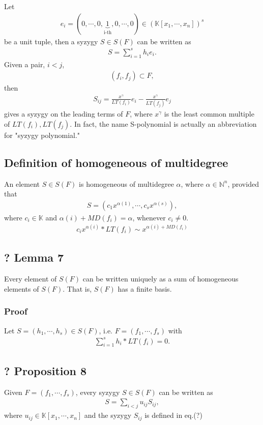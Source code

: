 \documentclass[11pt]{book}
\begin{document}
Let
\begin{eqnarray}
e_i = (0, \cdots, 0,\underbrace{1}_{\text{i-th}},0, \cdots, 0) \in (\mathbb{K}[x_1, \cdots, x_n])^s
\end{eqnarray}
be a unit tuple, then a syzygy $S \in S(F)$ can be written as
\begin{eqnarray}
S = \sum_{i=1}^s h_i e_i.
\end{eqnarray}
Given a pair, $i<j$,
\begin{eqnarray}
(f_i, f_j) \subset F,
\end{eqnarray}
then 
\begin{eqnarray}
S_{ij} =  \frac{x^\gamma}{LT(f_i)} e_i - \frac{x^\gamma}{LT(f_j)} e_j
\end{eqnarray}
gives a syzygy on the leading terms of $F$, where $x^\gamma$ is the least common multiple of $LT(f_i), LT(f_j)$.
In fact, the name S-polynomial is actually an abbreviation for "syzygy polynomial."

\subsection{Definition of homogeneous of multidegree}
An element $S \in S(F)$ is homogeneous of multidegree $\alpha$, where $\alpha \in \mathbb{N}^n$, provided that
\begin{eqnarray}
S = (c_1x^{\alpha(1)}, \cdots, c_sx^{\alpha(s)}),
\end{eqnarray}
where $c_i \in \mathbb{K}$ and $\alpha(i) + MD(f_i) = \alpha$, whenever $c_i \neq 0$.
\begin{eqnarray}
c_ix^{\alpha(i)} * LT(f_i) \sim x^{\alpha(i) + MD(f_i)}
\end{eqnarray}

\subsection{? Lemma 7}
Every element of $S(F)$ can be written uniquely as a sum of homogeneous elements of $S(F)$.
That is, $S(F)$ has a finite basis.

\subsubsection{Proof}
Let $S = (h_1, \cdots, h_s) \in S(F)$, i.e. $F = (f_1, \cdots, f_s)$ with
\begin{eqnarray}
\sum_{i=1}^s h_i * LT(f_i) = 0.
\end{eqnarray}


\subsection{? Proposition 8}
Given $F = (f_1, \cdots, f_s)$, every syzygy $S \in S(F)$ can be written as
\begin{eqnarray}
S = \sum_{i<j} u_{ij} S_{ij},
\end{eqnarray}
where $u_{ij} \in \mathbb{K}[x_1, \cdots, x_n]$ and the syzygy $S_{ij}$ is defined in eq.(?)
\end{document}
